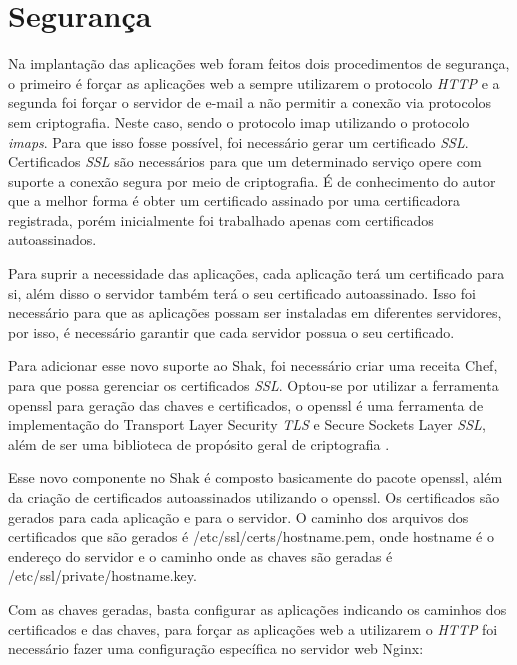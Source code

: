 \section{Segurança}
\label{sub:seguranca}

Na implantação das aplicações web foram feitos dois procedimentos de segurança, o primeiro
é forçar as aplicações web a sempre utilizarem o protocolo \textit{HTTP} e a segunda foi forçar o
servidor de e-mail a não permitir a conexão via protocolos sem criptografia. Neste
caso, sendo o protocolo imap utilizando o protocolo \textit{imaps}. Para que 
isso fosse possível, foi necessário gerar um certificado \textit{SSL}. Certificados 
\textit{SSL} são necessários para que um determinado serviço opere com suporte 
a conexão segura por meio de criptografia.
É de conhecimento do autor que a melhor forma é obter um certificado assinado
por uma certificadora registrada, porém inicialmente foi trabalhado apenas com certificados
autoassinados.

Para suprir a necessidade das aplicações, cada aplicação terá um certificado para
si, além disso o servidor também terá o seu certificado autoassinado. Isso foi necessário
para que as aplicações possam ser instaladas em diferentes servidores, por
isso, é necessário garantir que cada servidor possua o seu certificado. 

Para adicionar esse novo suporte ao Shak, foi necessário criar uma receita Chef,
para que possa gerenciar os certificados \textit{SSL}. Optou-se por utilizar a ferramenta
openssl para geração das chaves e certificados, o openssl é uma ferramenta de
implementação do Transport Layer Security \textit{TLS} e Secure Sockets Layer \textit{SSL},
além de ser uma biblioteca de propósito geral de criptografia \cite{openssl}.

Esse novo componente no Shak é composto basicamente do pacote openssl, além da criação
de certificados autoassinados utilizando o openssl. Os certificados são gerados 
para cada aplicação e para o servidor. O caminho dos arquivos dos certificados que 
são gerados é /etc/ssl/certs/hostname.pem, onde hostname é o endereço do servidor
e o caminho onde as chaves são geradas é /etc/ssl/private/hostname.key.

Com as chaves geradas, basta configurar as aplicações indicando os caminhos dos certificados
e das chaves, para forçar as aplicações web a utilizarem o \textit{HTTP} foi necessário fazer
uma configuração específica no servidor web Nginx:

